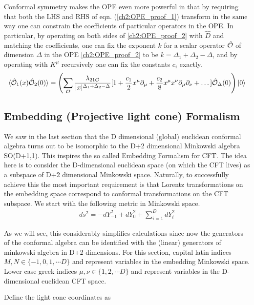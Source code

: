   Conformal symmetry makes the OPE even more powerful in that by requiring that both the LHS and RHS of eqn. (\ref{ch2:OPE_proof_1}) transform in the same way one can constrain the coefficients of particular operators in the OPE. In particular, by operating on both sides of \ref{ch2:OPE_proof_2} with $\hat D$ and matching the coefficients, one can fix the exponent $k$ for a scalar operator $\hat{\mathcal{{O}}}$ of dimension $\Delta$ in the OPE \ref{ch2:OPE_proof_2} to be $k=\Delta_1+\Delta_2-\Delta$, and by operating with $K^\mu$ recursively one can fix the constants $c_i$ exactly.
  \begin{multline}\label{ch2:OPE_final}
  \braket{\hat{\mathcal{{O}}}_1(x)\hat{\mathcal{{O}}}_2(0)}=\left(\sum_{{\mathcal{O}}}  \frac{\lambda_{21\mathcal{O}}}{|x|^{\Delta_1+\Delta_2 - \Delta}} [1+\frac{c_1}{2} x^\mu \partial_\mu +\frac{c_2}{8} x^\mu x^\nu \partial_\mu \partial_\nu + \dots]\hat{\mathcal{{O}}}_{\Delta}(0) \right) \ket{0} 
  \end{multline}

  
  \subsection{Embedding (Projective light cone) Formalism} \label{ch2:embedding}
  We saw in the last section that the D dimensional (global) euclidean conformal algebra turns out to be isomorphic to the D+2 dimensional Minkowski algebra SO(D+1,1). This inspires the so called Embedding Formalism for CFT. The idea here is to consider the D-dimensional euclidean space (on which the CFT lives) as a subspace of D+2 dimensional Minkowski space. Naturally, to successfully achieve this the most important requirement is that Lorentz transformations on the embedding space correspond to conformal transformations on the CFT subspace. We start with the following metric in Minkowski space. 
  \begin{align}
   ds^2 = -dY_{-1}^2 +dY_0^2 + \sum_{i=1}^D dY_i^2
  \end{align}
  
  As we will see, this considerably simplifies calculations since now the generators of the conformal algebra can be identified with the (linear) generators of minkowski algebra in D+2 dimensions.
  For this section, capital latin indices $M,N \in \{-1,0,1,\cdots D \}$ and represent variables in the embedding Minkowski space. Lower case greek indices $\mu,\nu \in \{1,2,\cdots D\}$ and represent variables in the D-dimensional euclidean CFT space. 
  
  Define the light cone coordinates as 
  
